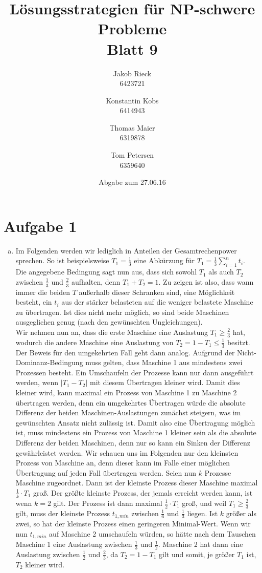 \documentclass[12pt,a4paper]{article}
\title{Lösungsstrategien für NP-schwere Probleme\\Blatt 9}
\author{
		Jakob Rieck\\
		\small{6423721}
	\and
		Konstantin Kobs\\
		\small{6414943}
	\and
		Thomas Maier\\
		\small{6319878}
	\and
		Tom Petersen\\
		\small{6359640}
}
\date{Abgabe zum 27.06.16}
\begin{document}
\maketitle

\section*{Aufgabe 1}

\begin{enumerate}[a)]
	\item Im Folgenden werden wir lediglich in Anteilen der Gesamtrechenpower sprechen. So ist beispielsweise $T_1 = \frac{1}{3}$ eine Abkürzung für $T_1 = \frac{1}{3} \sum_{i=1}^{n} t_i$.\\
		Die angegebene Bedingung sagt nun aus, dass sich sowohl $T_1$ als auch $T_2$ zwischen $\frac{1}{3}$ und $\frac{2}{3}$ aufhalten, denn $T_1 + T_2 = 1$. Zu zeigen ist also, dass wann immer die beiden $T$ außerhalb dieser Schranken sind, eine Möglichkeit besteht, ein $t_i$ aus der stärker belasteten auf die weniger belastete Maschine zu übertragen. Ist dies nicht mehr möglich, so sind beide Maschinen ausgeglichen genug (nach den gewünschten Ungleichungen).\\
		Wir nehmen nun an, dass die erste Maschine eine Auslastung $T_1 \geq \frac{2}{3}$ hat, wodurch die andere Maschine eine Auslastung von $T_2 = 1 - T_1 \leq \frac{1}{3}$ besitzt. Der Beweis für den umgekehrten Fall geht dann analog. Aufgrund der Nicht-Dominanz-Bedingung muss gelten, dass Maschine 1 aus mindestens zwei Prozessen besteht. Ein Umschaufeln der Prozesse kann nur dann ausgeführt werden, wenn $|T_1 - T_2|$ mit diesem Übertragen kleiner wird. Damit dies kleiner wird, kann maximal ein Prozess von Maschine 1 zu Maschine 2 übertragen werden, denn ein umgekehrtes Übertragen würde die absolute Differenz der beiden Maschinen-Auslastungen zunächst steigern, was im gewünschten Ansatz nicht zulässig ist. Damit also eine Übertragung möglich ist, muss mindestens ein Prozess von Maschine 1 kleiner sein als die absolute Differenz der beiden Maschinen, denn nur so kann ein Sinken der Differenz gewährleistet werden. Wir schauen uns im Folgenden nur den kleinsten Prozess von Maschine an, denn dieser kann im Falle einer möglichen Übertragung auf jeden Fall übertragen werden. Seien nun $k$ Prozesse Maschine zugeordnet. Dann ist der kleinste Prozess dieser Maschine maximal $\frac{1}{k} \cdot T_1$ groß. Der größte kleinste Prozess, der jemals erreicht werden kann, ist wenn $k=2$ gilt. Der Prozess ist dann maximal $\frac{1}{2} \cdot T_1$ groß, und weil $T_1 \geq \frac{2}{3}$ gilt, muss der kleinste Prozess $t_{1,min}$ zwischen $\frac{1}{6}$ und $\frac{1}{3}$ liegen. Ist $k$ größer als zwei, so hat der kleinste Prozess einen geringeren Minimal-Wert. Wenn wir nun $t_{1,min}$ auf Maschine 2 umschaufeln würden, so hätte nach dem Tauschen Maschine 1 eine Auslastung zwischen $\frac{1}{3}$ und $\frac{1}{2}$. Maschine 2 hat dann eine Auslastung zwischen $\frac{1}{2}$ und $\frac{2}{3}$, da $T_2 = 1 - T_1$ gilt und somit, je größer $T_1$ ist, $T_2$ kleiner wird.\\

\end{enumerate}
\end{document}
